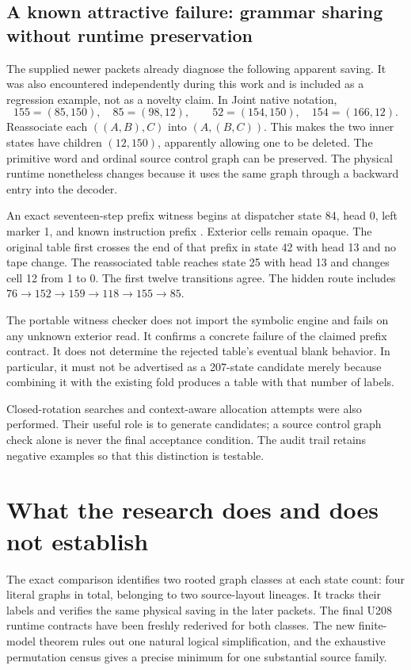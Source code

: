 \documentclass[11pt,a4paper]{article}
\newcommand{\file}[1]{\path{#1}}
\begin{document}


\subsection{A known attractive failure: grammar sharing without runtime preservation}

The supplied newer packets already diagnose the following apparent saving.
It was also encountered independently during this work and is included as
a regression example, not as a novelty claim. In Joint native notation,
\[
155=(85,150),\quad85=(98,12),\qquad
52=(154,150),\quad154=(166,12).
\]
Reassociate each $((A,B),C)$ into $(A,(B,C))$. This makes the two inner
states have children $(12,150)$, apparently allowing one to be deleted.
The primitive word and ordinal source control graph can be preserved.
The physical runtime nonetheless changes because it uses the same graph
through a backward entry into the decoder.

An exact seventeen-step prefix witness begins at dispatcher state 84,
head 0, left marker 1, and known instruction prefix
\file{0011001000001}. Exterior cells remain opaque. The original table
first crosses the end of that prefix in state 42 with head 13 and no tape
change. The reassociated table reaches state 25 with head 13 and changes
cell 12 from 1 to 0. The first twelve transitions agree. The hidden route
includes $76\to152\to159\to118\to155\to85$.

The portable witness checker does not import the symbolic engine and fails
on any unknown exterior read. It confirms a concrete failure of the claimed
prefix contract. It does not determine the rejected table's eventual blank
behavior. In particular, it must not be advertised as a 207-state candidate
merely because combining it with the existing fold produces a table with
that number of labels.

Closed-rotation searches and context-aware allocation attempts were also
performed. Their useful role is to generate candidates; a source control
graph check alone is never the final acceptance condition. The audit trail
retains negative examples so that this distinction is testable.

\section{What the research does and does not establish}

The exact comparison identifies two rooted graph classes at each state
count: four literal graphs in total, belonging to two source-layout
lineages. It tracks their labels and verifies the same physical saving in
the later packets. The final U208 runtime contracts
have been freshly rederived for both classes. The new finite-model theorem
rules out one natural logical simplification, and the exhaustive permutation
census gives a precise minimum for one substantial source family.
\end{document}

